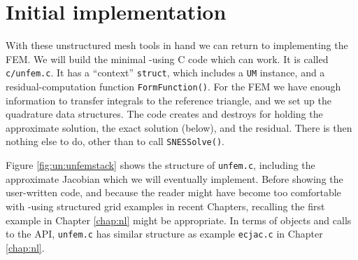 

\section{Initial implementation}

With these unstructured mesh tools in hand we can return to implementing the FEM.  We will build the minimal \pSNES-using C code which can work.  It is called \texttt{c/\CODELOC unfem.c}.  It has a ``context'' \texttt{struct}, which includes a \texttt{UM} instance, and a residual-computation function \texttt{FormFunction()}.  For the FEM we have enough information to transfer integrals to the reference triangle, and we set up the quadrature data structures.  The code creates and destroys \pVecs for holding the approximate solution, the exact solution (below), and the residual.  There is then nothing else to do, other than to call \texttt{SNESSolve()}.

Figure \ref{fig:un:unfemstack} shows the structure of \texttt{unfem.c}, including the approximate Jacobian which we will eventually implement.  Before showing the user-written code, and because the reader might have become too comfortable with \pDMDA-using structured grid examples in recent Chapters, recalling the first example in Chapter \ref{chap:nl} might be appropriate.  In terms of \PETSc objects and calls to the \PETSc API, \texttt{unfem.c} has similar structure as example \texttt{ecjac.c} in Chapter \ref{chap:nl}.

